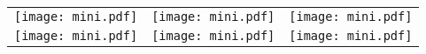 \centering
\begin{tabular}{ccc}
  \texttt{[image: mini.pdf]} &
  \texttt{[image: mini.pdf]} &
  \texttt{[image: mini.pdf]} \\
  \texttt{[image: mini.pdf]} &
  \texttt{[image: mini.pdf]} \rule{0pt}{80pt} &
  \texttt{[image: mini.pdf]} \\
\end{tabular}
